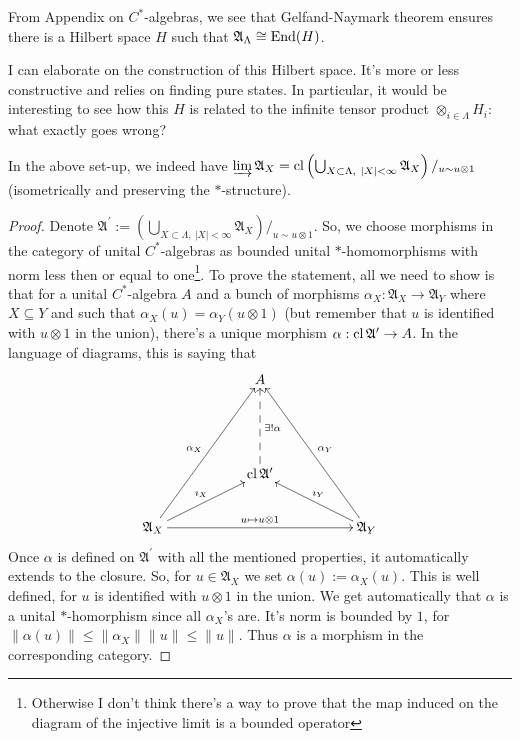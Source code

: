 From Appendix on $C^*$-algebras, we see that Gelfand-Naymark theorem ensures there is a Hilbert space $H$ such that $\mathfrak A_{\Lambda} \cong \operatorname{End}(H)$.
\begin{fur}
I can elaborate on the construction of this Hilbert space. It's more or less constructive and relies on finding pure states. In particular, it would be interesting to see how this $H$ is related to the infinite tensor product $\otimes_{i \in \Lambda} H_i$: what exactly goes wrong?
\end{fur}
\begin{proposition}
In the above set-up, we indeed have $\varinjlim \mathfrak A_{X} = \operatorname{cl} \left(\bigcup_{X \subset \Lambda, \ |X| < \infty} \mathfrak A_{X}\right)/_{u \sim u \otimes 1}$ (isometrically and preserving the $\ast$-structure).
\end{proposition}
\begin{proof}
Denote $\mathfrak A^\prime := \left(\bigcup_{X \subset \Lambda, \ |X|<\infty} \mathfrak A_X\right)/_{u \sim u \otimes 1}$.
So, we choose morphisms in the category of unital $C^*$-algebras as bounded unital $\ast$-homomorphisms with norm less then or equal to one\footnote{Otherwise I don't think there's a way to prove that the map induced on the diagram of the injective limit is a bounded operator}. To prove the statement, all we need to show is that for a unital $C^*$-algebra $A$ and a bunch of morphisms $\alpha_X : \mathfrak A_X \rightarrow \mathfrak A_Y$ where $X \subseteq Y$ and such that $\alpha_X(u) = \alpha_Y(u \otimes 1)$ (but remember that $u$ is identified with $u \otimes 1$ in the union), there's a unique morphism $\alpha : \operatorname{cl} \mathfrak A^\prime \rightarrow A$. In the language of diagrams, this is saying that
\[
\xymatrix{
& & A & & \\
& &  & & \\
& & \cl \mathfrak A^\prime\ar@{-->}[uu]_{\exists ! \alpha} & &\\
\mathfrak A_X\ar[rrrr]^{u \mapsto u \otimes 1} \ar[rru]^{\imath_X} \ar[rruuu]^{\alpha_X} & & & & \mathfrak A_Y\ar[lluuu]_{\alpha_Y} \ar[llu]_{\imath_Y}
}
\]
Once $\alpha$ is defined on $\mathfrak A^\prime$ with all the mentioned properties, it automatically extends to the closure. So, for $u \in \mathfrak A_X$ we set $\alpha(u) := \alpha_X(u)$. This is well defined, for $u$ is identified with $u \otimes 1$ in the union. We get automatically that $\alpha$ is a unital $\ast$-homorphism since all $\alpha_X$'s are. It's norm is bounded by $1$, for $\|\alpha(u)\| \leq \|\alpha_X\|\|u\| \leq \|u\|$. Thus $\alpha$ is a morphism in the corresponding category.
\end{proof}

